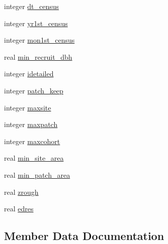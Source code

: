 \begin{DoxyCompactItemize}
\item 
integer \hyperlink{structename__coms_1_1ename__vars_acd4adb0912926306cac73aa6abd71d16}{dt\+\_\+census}
\item 
integer \hyperlink{structename__coms_1_1ename__vars_af95f646dffc7bafbdef282c1e0a0b915}{yr1st\+\_\+census}
\item 
integer \hyperlink{structename__coms_1_1ename__vars_ae40cd69d3cc0356ef74b6601983a7117}{mon1st\+\_\+census}
\item 
real \hyperlink{structename__coms_1_1ename__vars_a37fb5aa022f4e56a4ef81c559ef4e9de}{min\+\_\+recruit\+\_\+dbh}
\item 
integer \hyperlink{structename__coms_1_1ename__vars_a357ee72a65ad802f0b513dc1268da08b}{idetailed}
\item 
integer \hyperlink{structename__coms_1_1ename__vars_a294ad8776f6d095b807d079865c0a54d}{patch\+\_\+keep}
\item 
integer \hyperlink{structename__coms_1_1ename__vars_a99fff9e51d613657edd955243887f482}{maxsite}
\item 
integer \hyperlink{structename__coms_1_1ename__vars_a01e1c83c95742bf3eaefd9ae4ccfa2e6}{maxpatch}
\item 
integer \hyperlink{structename__coms_1_1ename__vars_aac6b1a6dacad31908a45c14d43a78b26}{maxcohort}
\item 
real \hyperlink{structename__coms_1_1ename__vars_ac833ed6581d85c10f8317a93d40cc9b8}{min\+\_\+site\+\_\+area}
\item 
real \hyperlink{structename__coms_1_1ename__vars_a273f97fba1fc90af65c28ee6d7f525d7}{min\+\_\+patch\+\_\+area}
\item 
real \hyperlink{structename__coms_1_1ename__vars_a3d58740a12137c047498e7ea2e9482d7}{zrough}
\item 
real \hyperlink{structename__coms_1_1ename__vars_ad0785dccc376081a8249a9d2f4ddc43d}{edres}
\end{DoxyCompactItemize}


\subsection{Member Data Documentation}
\mbox{\label{structename__coms_1_1ename__vars_a7a77bc951dacf24a3ac1538b524e9c1d}} 
